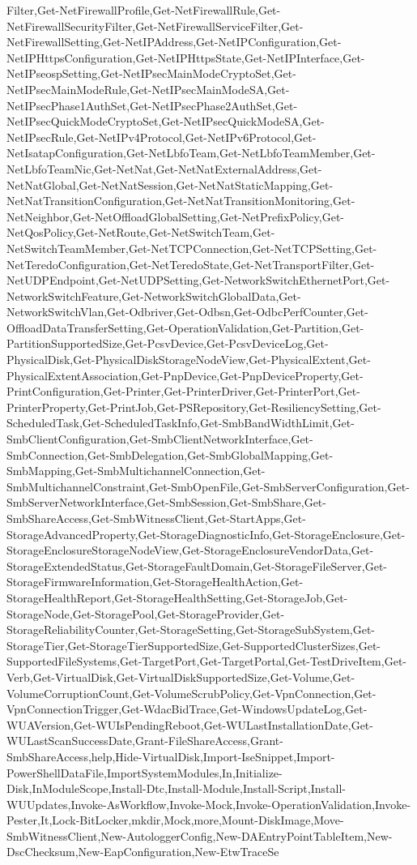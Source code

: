{{Filter,Get-NetFirewallProfile,Get-NetFirewallRule,Get-NetFirewallSecurityFilter,Get-NetFirewallServiceFilter,Get-NetFirewallSetting,Get-NetIPAddress,Get-NetIPConfiguration,Get-NetIPHttpsConfiguration,Get-NetIPHttpsState,Get-NetIPInterface,Get-NetIPseospSetting,Get-NetIPsecMainModeCryptoSet,Get-NetIPsecMainModeRule,Get-NetIPsecMainModeSA,Get-NetIPsecPhase1AuthSet,Get-NetIPsecPhase2AuthSet,Get-NetIPsecQuickModeCryptoSet,Get-NetIPsecQuickModeSA,Get-NetIPsecRule,Get-NetIPv4Protocol,Get-NetIPv6Protocol,Get-NetIsatapConfiguration,Get-NetLbfoTeam,Get-NetLbfoTeamMember,Get-NetLbfoTeamNic,Get-NetNat,Get-NetNatExternalAddress,Get-NetNatGlobal,Get-NetNatSession,Get-NetNatStaticMapping,Get-NetNatTransitionConfiguration,Get-NetNatTransitionMonitoring,Get-NetNeighbor,Get-NetOffloadGlobalSetting,Get-NetPrefixPolicy,Get-NetQosPolicy,Get-NetRoute,Get-NetSwitchTeam,Get-NetSwitchTeamMember,Get-NetTCPConnection,Get-NetTCPSetting,Get-NetTeredoConfiguration,Get-NetTeredoState,Get-NetTransportFilter,Get-NetUDPEndpoint,Get-NetUDPSetting,Get-NetworkSwitchEthernetPort,Get-NetworkSwitchFeature,Get-NetworkSwitchGlobalData,Get-NetworkSwitchVlan,Get-Odbriver,Get-Odbsn,Get-OdbcPerfCounter,Get-OffloadDataTransferSetting,Get-OperationValidation,Get-Partition,Get-PartitionSupportedSize,Get-PcsvDevice,Get-PcsvDeviceLog,Get-PhysicalDisk,Get-PhysicalDiskStorageNodeView,Get-PhysicalExtent,Get-PhysicalExtentAssociation,Get-PnpDevice,Get-PnpDeviceProperty,Get-PrintConfiguration,Get-Printer,Get-PrinterDriver,Get-PrinterPort,Get-PrinterProperty,Get-PrintJob,Get-PSRepository,Get-ResiliencySetting,Get-ScheduledTask,Get-ScheduledTaskInfo,Get-SmbBandWidthLimit,Get-SmbClientConfiguration,Get-SmbClientNetworkInterface,Get-SmbConnection,Get-SmbDelegation,Get-SmbGlobalMapping,Get-SmbMapping,Get-SmbMultichannelConnection,Get-SmbMultichannelConstraint,Get-SmbOpenFile,Get-SmbServerConfiguration,Get-SmbServerNetworkInterface,Get-SmbSession,Get-SmbShare,Get-SmbShareAccess,Get-SmbWitnessClient,Get-StartApps,Get-StorageAdvancedProperty,Get-StorageDiagnosticInfo,Get-StorageEnclosure,Get-StorageEnclosureStorageNodeView,Get-StorageEnclosureVendorData,Get-StorageExtendedStatus,Get-StorageFaultDomain,Get-StorageFileServer,Get-StorageFirmwareInformation,Get-StorageHealthAction,Get-StorageHealthReport,Get-StorageHealthSetting,Get-StorageJob,Get-StorageNode,Get-StoragePool,Get-StorageProvider,Get-StorageReliabilityCounter,Get-StorageSetting,Get-StorageSubSystem,Get-StorageTier,Get-StorageTierSupportedSize,Get-SupportedClusterSizes,Get-SupportedFileSystems,Get-TargetPort,Get-TargetPortal,Get-TestDriveItem,Get-Verb,Get-VirtualDisk,Get-VirtualDiskSupportedSize,Get-Volume,Get-VolumeCorruptionCount,Get-VolumeScrubPolicy,Get-VpnConnection,Get-VpnConnectionTrigger,Get-WdacBidTrace,Get-WindowsUpdateLog,Get-WUAVersion,Get-WUIsPendingReboot,Get-WULastInstallationDate,Get-WULastScanSuccessDate,Grant-FileShareAccess,Grant-SmbShareAccess,help,Hide-VirtualDisk,Import-IseSnippet,Import-PowerShellDataFile,ImportSystemModules,In,Initialize-Disk,InModuleScope,Install-Dtc,Install-Module,Install-Script,Install-WUUpdates,Invoke-AsWorkflow,Invoke-Mock,Invoke-OperationValidation,Invoke-Pester,It,Lock-BitLocker,mkdir,Mock,more,Mount-DiskImage,Move-SmbWitnessClient,New-AutologgerConfig,New-DAEntryPointTableItem,New-DscChecksum,New-EapConfiguration,New-EtwTraceSe}}
